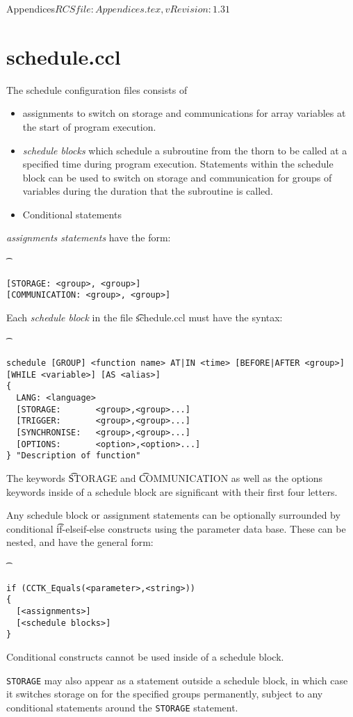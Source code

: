 \begin{cactuspart}{6}{Appendices}{$RCSfile: Appendices.tex,v $}{$Revision: 1.31 $}
\section{schedule.ccl}
\label{sec:sc}

The schedule configuration files consists of
\begin{itemize}
\item{} assignments to switch on storage and communications
        for array variables at the start of program execution.
\item{} {\it schedule blocks} which schedule a subroutine from the
        thorn to be called at a specified time during program
        execution. Statements within the schedule block can
        be used to switch on storage and communication for groups
        of variables during the duration that the subroutine is called.
\item{} Conditional statements
\end{itemize}

{\it assignments statements} have the form:
{\t
\begin{verbatim}
[STORAGE: <group>, <group>]
[COMMUNICATION: <group>, <group>]
\end{verbatim}
}

Each {\it schedule block} in the file {\t schedule.ccl} must have
the syntax:
{\t
\begin{verbatim}
schedule [GROUP] <function name> AT|IN <time> [BEFORE|AFTER <group>] [WHILE <variable>] [AS <alias>]
{
  LANG: <language>
  [STORAGE:       <group>,<group>...]
  [TRIGGER:       <group>,<group>...]
  [SYNCHRONISE:   <group>,<group>...]
  [OPTIONS:       <option>,<option>...]
} "Description of function"
\end{verbatim}
}

The keywords {\t STORAGE} and {\t COMMUNICATION} as well as the options keywords
inside of a schedule block are significant with their first four letters.

Any schedule block or assignment statements can be optionally
surrounded by conditional {\t if-elseif-else}
constructs using the parameter data base. These can be nested,
and have the general form:
{\t
\begin{verbatim}
if (CCTK_Equals(<parameter>,<string>))
{
  [<assignments>]
  [<schedule blocks>]
}
\end{verbatim}
}

Conditional constructs cannot be used inside of a schedule block.

{\tt STORAGE} may also appear as a statement outside a schedule block,
in which case it switches storage on for the specified groups permanently,
subject to any conditional statements around the {\tt STORAGE} statement.


\end{cactuspart}
